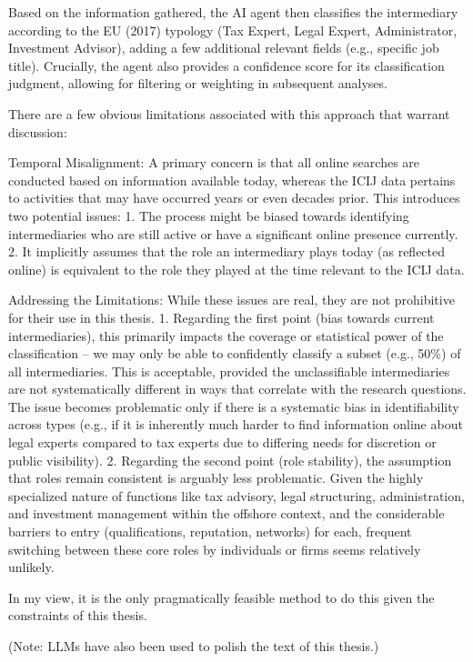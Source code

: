 Based on the information gathered, the AI agent then classifies the intermediary according to the EU (2017) typology (Tax Expert, Legal Expert, Administrator, Investment Advisor), adding a few additional relevant fields (e.g., specific job title). Crucially, the agent also provides a confidence score for its classification judgment, allowing for filtering or weighting in subsequent analyses.

There are a few obvious limitations associated with this approach that warrant discussion:

Temporal Misalignment: A primary concern is that all online searches are conducted based on information available today, whereas the ICIJ data pertains to activities that may have occurred years or even decades prior. This introduces two potential issues:
    1.  The process might be biased towards identifying intermediaries who are still active or have a significant online presence currently.
    2.  It implicitly assumes that the role an intermediary plays today (as reflected online) is equivalent to the role they played at the time relevant to the ICIJ data.

Addressing the Limitations: While these issues are real, they are not prohibitive for their use in this thesis.
1. Regarding the first point (bias towards current intermediaries), this primarily impacts the coverage or statistical power of the classification – we may only be able to confidently classify a subset (e.g., 50\%) of all intermediaries. This is acceptable, provided the unclassifiable intermediaries are not systematically different in ways that correlate with the research questions. The issue becomes problematic only if there is a systematic bias in identifiability across types (e.g., if it is inherently much harder to find information online about legal experts compared to tax experts due to differing needs for discretion or public visibility).
2. Regarding the second point (role stability), the assumption that roles remain consistent is arguably less problematic. Given the highly specialized nature of functions like tax advisory, legal structuring, administration, and investment management within the offshore context, and the considerable barriers to entry (qualifications, reputation, networks) for each, frequent switching between these core roles by individuals or firms seems relatively unlikely.

In my view, it is the only pragmatically feasible method to do this given the constraints of this thesis.

(Note: LLMs have also been used to polish the text of this thesis.)
